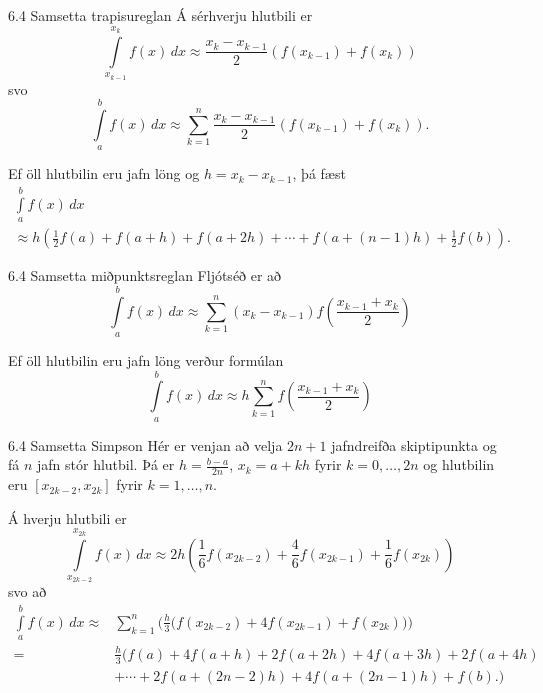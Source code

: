 \begin{frame}{6.4 Samsetta trapisureglan} 
Á sérhverju hlutbili er
\begin{equation*}
  \int\limits_{x_{k-1}}^{x_k} f(x) \, dx
  \approx
  \frac{x_k-x_{k-1}}{2}(f(x_{k-1}) + f(x_k))
\end{equation*}
svo
\begin{equation*}
  \int\limits_a^b f(x) \, dx
  \approx
  \sum\limits_{k=1}^n \frac{x_k-x_{k-1}}{2}(f(x_{k-1}) + f(x_k)).
\end{equation*}

\pause
\smallskip
Ef öll hlutbilin eru jafn löng og $h = x_k-x_{k-1}$, \pause
þá fæst
\begin{multline*}
  \int\limits_a^b f(x) \, dx \\
  \approx 
  h\left( \frac{1}{2}f(a) + f(a+h) + f(a+2h) 
    + \cdots + f(a+(n-1)h) + \frac{1}{2}f(b) \right).
\end{multline*}\end{frame}


\begin{frame}{6.4 Samsetta miðpunktsreglan} 
Fljótséð er að
\begin{equation*}
  \int\limits_a^b f(x) \, dx
  \approx
  \sum\limits_{k=1}^n (x_k-x_{k-1})f
  \left(
    \frac{x_{k-1}+x_k}{2}
  \right)
\end{equation*}

\pause
\smallskip
Ef öll hlutbilin eru jafn löng verður formúlan
\begin{equation*}
  \int\limits_a^b f(x) \, dx
  \approx
  h \sum\limits_{k=1}^n f \left(\frac{x_{k-1}+x_k}{2}\right)
\end{equation*}
\end{frame}


\begin{frame}{6.4 Samsetta Simpson}
Hér er venjan að velja $2n+1$ jafndreifða skiptipunkta og fá $n$ jafn
stór hlutbil. Þá er $h = \frac{b-a}{2n}$, $x_k = a + kh$ fyrir $k =
0,\ldots,2n$ og hlutbilin eru $[x_{2k-2},x_{2k}]$ fyrir $k = 1,
\ldots, n$. 

\pause
\smallskip
Á hverju hlutbili er 
\begin{equation*}
  \int\limits_{x_{2k-2}}^{x_{2k}} f(x) \, dx
  \approx
  2h \left(
    \frac{1}{6} f(x_{2k-2}) + \frac{4}{6} f(x_{2k-1}) 
    + \frac{1}{6} f(x_{2k})
  \right)
\end{equation*}
\pause
svo að
{\small 
\begin{align*}
  \int\limits_a^b f(x) \, dx
  \approx &
  \sum\limits_{k=1}^n
  \bigg(
    \frac{h}{3}
    \Big(
      f(x_{2k-2}) + 4f(x_{2k-1}) + f(x_{2k})
    \Big)
  \bigg) \\
  = &
  \frac{h}{3}
  \Big( 
    f(a) + 4f(a+h) + 2f(a+2h)+ 4f(a+3h) + 2f(a+4h) \\
    &+ \cdots + 2f(a+(2n-2)h) + 4f(a+(2n-1)h) + f(b).
  \Big)
\end{align*}}
\end{frame}


